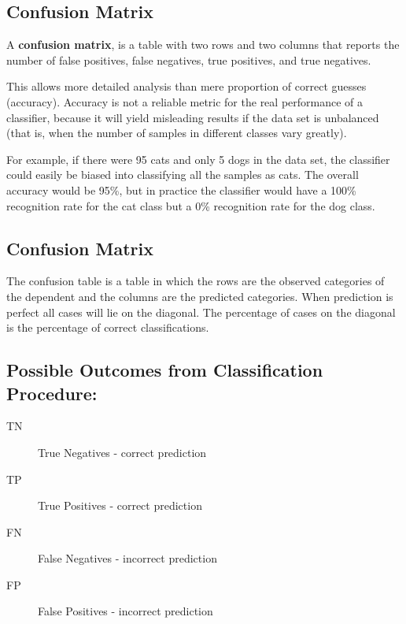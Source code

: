 \documentclass[a4paper,12pt]{article}
\begin{document}
\subsection{Confusion Matrix}

A \textbf{confusion matrix}, is a table with two rows and two columns that reports the number of false positives, false negatives, true positives, and true negatives.

This allows more detailed analysis than mere proportion of correct guesses (accuracy). Accuracy is not a reliable metric for the real performance of a classifier, because it will yield misleading results if the data set is unbalanced (that is, when the number of samples in different classes vary greatly).

For example, if there were 95 cats and only 5 dogs in the data set, the classifier could easily be biased into classifying all the samples as cats. The overall accuracy would be 95\%, but  in practice the classifier would have a 100\% recognition rate for the cat class but a 0\% recognition rate for the dog class.

	\subsection*{Confusion Matrix}
The confusion table is a table in which the rows are the observed categories of
the dependent and the columns are the predicted categories. When prediction
is perfect all cases will lie on the diagonal. The percentage of cases on the
diagonal is the percentage of correct classifications. 	
	\subsection*{Possible Outcomes from Classification Procedure:}
	\begin{description}
		\item[TN] True Negatives - correct prediction
		\item[TP] True Positives - correct prediction
		\item[FN] False Negatives - incorrect prediction
		\item[FP] False Positives - incorrect prediction
	\end{description}
\end{document}
